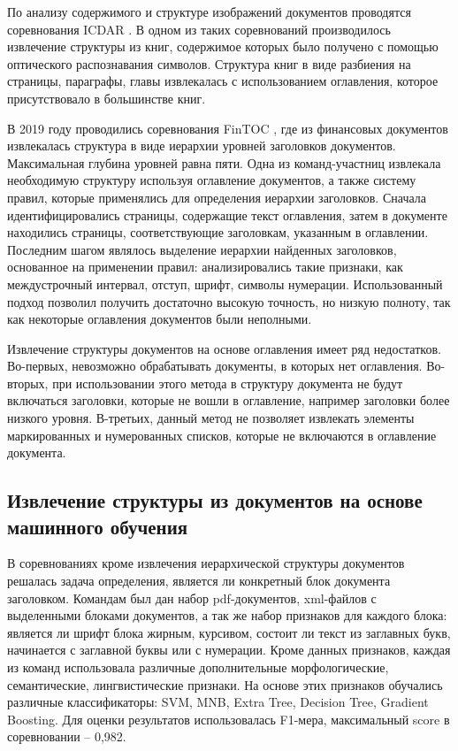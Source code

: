\documentclass{ProcISPRAS}
\begin{document}
По анализу содержимого и структуре изображений документов проводятся соревнования ICDAR \cite{icdar13, icdar17comp, icdar17}. В одном из таких соревнований \cite{icdar13} производилось извлечение структуры из книг, содержимое которых было получено с помощью оптического распознавания символов. Структура книг в виде разбиения на страницы, параграфы, главы извлекалась с использованием оглавления, которое присутствовало в большинстве книг. 

В 2019 году проводились соревнования FinTOC \cite{fintoc19comp}, где из финансовых документов извлекалась структура в виде иерархии уровней заголовков документов. Максимальная глубина уровней равна пяти. Одна из команд-участниц \cite{fintoc19daniel} извлекала необходимую структуру используя оглавление документов, а также систему правил, которые применялись для определения иерархии заголовков.
Сначала идентифицировались страницы, содержащие текст оглавления, затем в документе находились страницы, соответствующие заголовкам, указанным в оглавлении. 
Последним шагом являлось выделение иерархии найденных заголовков, основанное на применении правил: анализировались такие признаки, как междустрочный интервал, отступ, шрифт, символы нумерации.
Использованный подход позволил получить достаточно высокую точность, но низкую полноту, так как некоторые оглавления документов были неполными.

Извлечение структуры документов на основе оглавления имеет ряд недостатков. Во-первых, невозможно обрабатывать документы, в которых нет оглавления. Во-вторых, при использовании этого метода в структуру документа не будут включаться заголовки, которые не вошли в оглавление, например заголовки более низкого уровня. В-третьих, данный метод не позволяет извлекать элементы маркированных и нумерованных списков, которые не включаются в оглавление документа.

\subsection{Извлечение структуры из документов на основе машинного обучения}

В соревнованиях \cite{fintoc19comp} кроме извлечения иерархической структуры документов решалась задача определения, является ли конкретный блок документа заголовком. Командам был дан набор pdf-документов, xml-файлов с выделенными блоками документов, а так же набор признаков для каждого блока: является ли шрифт блока жирным, курсивом, состоит ли текст из заглавных букв, начинается с заглавной буквы или с нумерации. Кроме данных признаков, каждая из команд использовала различные дополнительные морфологические, семантические, лингвистические признаки. На основе этих признаков обучались различные классификаторы: SVM, MNB, Extra Tree, Decision Tree, Gradient Boosting. Для оценки результатов использовалась F1-мера, максимальный score в соревновании -- 0,982.
\end{document}

